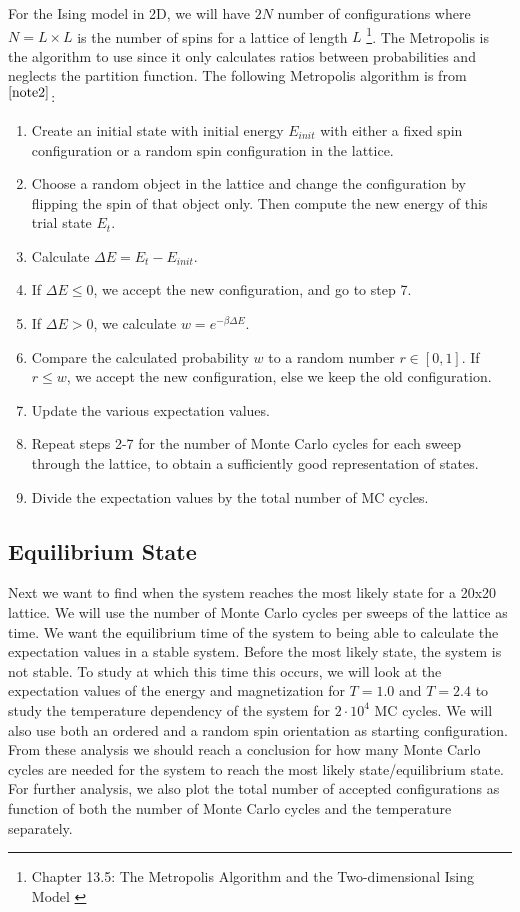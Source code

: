 \documentclass[12pt,a4paper,english]{article}
\begin{document}
For the Ising model in 2D, we will have $2N$ number of configurations where $N=L\times L$ is the number of spins for a lattice of length $L$ \footnote{\label{note2}Chapter 13.5: The Metropolis Algorithm and the Two-dimensional Ising Model \cite{ComPhys}}. The Metropolis is the algorithm to use since it only calculates ratios between probabilities and neglects the partition function. The following Metropolis algorithm is from \citet{ComPhys}$^{\ref{note2}}$:
\begin{enumerate}
	\item Create an initial state with initial energy $E_{init}$ with either a fixed spin configuration or a random spin configuration in the lattice.
	\item Choose a random object in the lattice and change the configuration by flipping the spin of that object only. Then compute the new energy of this trial state $E_t$.
	\item Calculate $\Delta E=E_t-E_{init}$.
	\item If $\Delta E\leq0$, we accept the new configuration, and go to step 7.
	\item If $\Delta E>0$, we calculate $w=e^{-\beta \Delta E}$.
	\item Compare the calculated probability $w$ to a random number $r\in[0,1]$. If $r\leq w$, we accept the new configuration, else we keep the old configuration.
	\item Update the various expectation values.
	\item Repeat steps 2-7 for the number of Monte Carlo cycles for each sweep through the lattice, to obtain a sufficiently good representation of states.
	\item Divide the expectation values by the total number of MC cycles.
\end{enumerate}

\subsection{Equilibrium State}
\label{subsect:Equilibrium}
Next we want to find when the system reaches the most likely state for a 20x20 lattice. We will use the number of Monte Carlo cycles per sweeps of the lattice as time. We want the equilibrium time of the system to being able to calculate the expectation values in a stable system. Before the most likely state, the system is not stable. To study at which this time this occurs, we will look at the expectation values of the energy and magnetization for $T=1.0$ and $T=2.4$ to study the temperature dependency of the system for $2\cdot10^4$ MC cycles. We will also use both an ordered and a random spin orientation as starting configuration. From these analysis we should reach a conclusion for how many Monte Carlo cycles are needed for the system to reach the most likely state/equilibrium state. For further analysis, we also plot the total number of accepted configurations as function of both the number of Monte Carlo cycles and the temperature separately.
\end{document}
